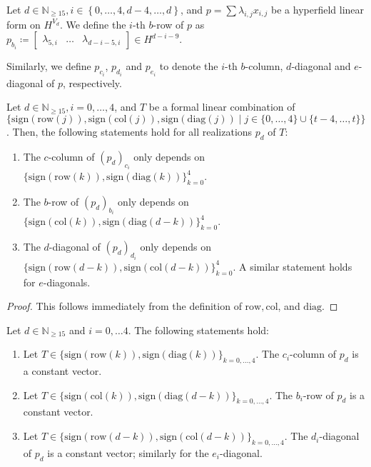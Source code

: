 \begin{definition}
    Let \( d \in \mathbb{N}_{\geq 15} , i \in \left\{ 0,\dots,4,d-4, \dots, d \right\}\), and $p = \sum \lambda_{i,j} x_{i,j}$ be a hyperfield linear form on \( H^{V_d} \). We define the $i$-th $b$-row of $p$ as \( p_{b_{i}} \coloneqq \begin{bmatrix} \lambda_{5,i} & \dots & \lambda_{d-i-5,i} \end{bmatrix} \in H^{d -  i - 9} \).
  
   Similarly, we define $p_{c_{i}}$, $p_{d_{i}}$ and $p_{e_{i}}$ to denote the $i$-th $b$-column, $d$-diagonal and $e$-diagonal of $p$, respectively.
  \end{definition}


\begin{proposition}\label{prop:nwfiewnfiuwneufni2un2}
    Let \( d \in \mathbb{N}_{\geq 15} , i  = 0, \dots, 4\), and $T$ be a formal linear combination of \(  \{ \mathrm{sign}(\mathrm{row}(j)), \mathrm{sign}(\mathrm{col}(j)), \mathrm{sign}(\mathrm{diag}(j)) \mid j \in \{ 0, \dots, 4\} \cup \{ t-4, \dots, t \} \} \).
Then, the following statements hold for all realizations \( p_d \) of \( T \):
  \begin{enumerate}
  \item The $c$-column of $(p_d)_{c_i}$ only depends on $\{ \mathrm{sign}(\mathrm{row}(k)), \mathrm{sign}(\mathrm{diag}(k)) \}_{k = 0}^4$.
  \item The $b$-row of $(p_d)_{b_i}$ only depends on $\{ \mathrm{sign}(\mathrm{col}(k)), \mathrm{sign}(\mathrm{diag}(d-k)) \}_{k = 0}^4$.
  \item The $d$-diagonal of $(p_d)_{d_i}$ only depends on \(\{ \mathrm{sign}(\mathrm{row}(d-k)), \mathrm{sign}(\mathrm{col}(d-k)) \}_{k = 0}^4 \). A similar statement holds for $e$-diagonals.
  \end{enumerate}
  \end{proposition}
  
  \begin{proof}
   This follows immediately from the definition of $\mathrm{row}, \mathrm{col}$, and $\mathrm{diag}$.
  \end{proof}

  \begin{proposition}
    Let \( d \in \mathbb{N}_{\geq 15} \) and \( i = 0, \dots 4 \).
    The following statements hold:
    \begin{enumerate}
    \item Let $T \in \{\mathrm{sign}(\mathrm{row}(k)), \mathrm{sign}(\mathrm{diag}(k)) \}_{k = 0, \dots, 4}$. The $c_{i}$-column of $p_d$ is a constant vector. 
  
    \item Let $T \in \{\mathrm{sign}( \mathrm{col}(k)),\mathrm{sign}(\mathrm{diag}(d-k)) \}_{k = 0, \dots, 4}$. The $b_{i}$-row of $p_d$ is a constant vector. 
  
    \item Let $T \in \{ \mathrm{sign}(\mathrm{row}(d-k)), \mathrm{sign}(\mathrm{col}(d-k)) \}_{k = 0, \dots, 4}$. The $d_{i}$-diagonal of $p_d$ is a constant vector; similarly for the $e_{i}$-diagonal. 
    \end{enumerate}
  \end{proposition}
  
